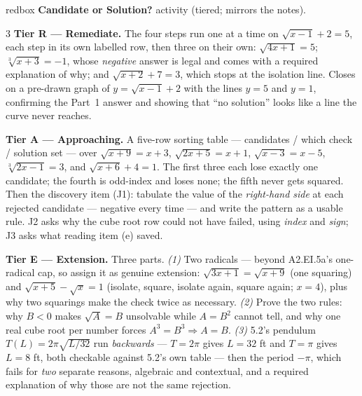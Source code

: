\documentclass[10pt]{article}
\begin{document}
\begin{skillbox}{redbox}
\textbf{Candidate or Solution?} activity (tiered; mirrors the notes).
\begin{multicols}{3}
\textbf{Tier R --- Remediate.} The four steps run one at a time on $\sqrt{x-1}+2=5$, each step in
its own labelled row, then three on their own: $\sqrt{4x+1}=5$; $\sqrt[3]{x+3}=-1$, whose
\emph{negative} answer is legal and comes with a required explanation of why; and
$\sqrt{x+2}+7=3$, which stops at the isolation line. Closes on a pre-drawn graph of
$y=\sqrt{x-1}+2$ with the lines $y=5$ and $y=1$, confirming the Part~1 answer and showing that
``no solution'' looks like a line the curve never reaches.

\columnbreak
\textbf{Tier A --- Approaching.} A five-row sorting table --- candidates / which check / solution
set --- over $\sqrt{x+9}=x+3$, $\sqrt{2x+5}=x+1$, $\sqrt{x-3}=x-5$, $\sqrt[3]{2x-1}=3$, and
$\sqrt{x+6}+4=1$. The first three each lose exactly one candidate; the fourth is odd-index and loses
none; the fifth never gets squared. Then the discovery item (J1): tabulate the value of the
\emph{right-hand side} at each rejected candidate --- negative every time --- and write the pattern
as a usable rule. J2 asks why the cube root row could not have failed, using \emph{index} and
\emph{sign}; J3 asks what reading item (e) saved.

\columnbreak
\textbf{Tier E --- Extension.} Three parts. \emph{(1)} Two radicals --- beyond A2.EI.5a's
one-radical cap, so assign it as genuine extension: $\sqrt{3x+1}=\sqrt{x+9}$ (one squaring) and
$\sqrt{x+5}-\sqrt{x}=1$ (isolate, square, isolate again, square again; $x=4$), plus why two
squarings make the check twice as necessary. \emph{(2)} Prove the two rules: why $B<0$ makes
$\sqrt{A}=B$ unsolvable while $A=B^{2}$ cannot tell, and why one real cube root per number forces
$A^{3}=B^{3}\Rightarrow A=B$. \emph{(3)} 5.2's pendulum $T(L)=2\pi\sqrt{L/32}$ run \emph{backwards}
--- $T=2\pi$ gives $L=32$ ft and $T=\pi$ gives $L=8$ ft, both checkable against 5.2's own table ---
then the period $-\pi$, which fails for \emph{two} separate reasons, algebraic and contextual, and a
required explanation of why those are not the same rejection.
\end{multicols}
\end{skillbox}
\end{document}
